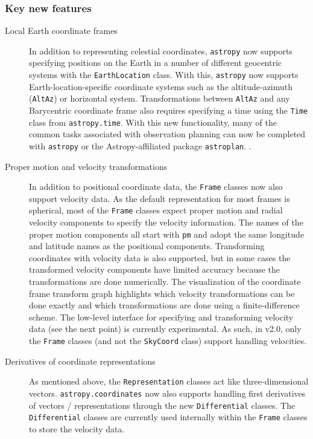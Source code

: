 \documentclass[modern]{aastex61}
\newcommand{\package}[1]{\texttt{#1}\xspace}
\newcommand{\astropy}{Astropy\xspace}
\newcommand{\astropypkg}{\package{astropy}\xspace}
\newcommand{\inlinecomment}[2]{\todo[inline]{#1: #2}\xspace}
\begin{document}
\subsubsection{Key new features}

\begin{description}
    \item[Local Earth coordinate frames] In addition to representing celestial
    coordinates, \astropypkg now supports specifying positions on the Earth in
    a number of different geocentric systems with the \texttt{EarthLocation}
    class.
    With this, \astropypkg now supports Earth-location-specific coordinate
    systems such as the altitude-azimuth (\texttt{AltAz}) or horizontal system.
    Transformations between \texttt{AltAz} and any Barycentric coordinate frame
    also requires specifying a time using the \texttt{Time} class from
    \texttt{astropy.time}.
    With this new functionality, many of the common tasks associated with
    observation planning can now be completed with \astropypkg or the
    \astropy-affiliated package \package{astroplan}. \inlinecomment{APW}{TODO: cite zenodo entry for astroplan?}.

    \item[Proper motion and velocity transformations]
    In addition to positional coordinate data, the \texttt{Frame} classes now
    also support velocity data.
    As the default representation for most frames is spherical, most of the
    \texttt{Frame} classes expect proper motion and radial velocity components
    to specify the velocity information.
    The names of the proper motion components all start with \texttt{pm} and
    adopt the same longitude and latitude names as the positional components.
    Transforming coordinates with velocity data is also supported, but in some
    cases the transformed velocity components have limited accuracy because the
    transformations are done numerically.
    The visualization of the coordinate frame transform graph highlights which
    velocity transformations can be done exactly and which transformations are
    done using a finite-difference scheme.
    The low-level interface for specifying and transforming velocity data (see
    the next point) is currently experimental.
    As such, in v2.0, only the \texttt{Frame} classes (and not the
    \texttt{SkyCoord} class) support handling velocities.

    \item[Derivatives of coordinate representations]
    As mentioned above, the \texttt{Representation} classes act like
    three-dimensional vectors.
    \texttt{astropy.coordinates} now also supports handling first derivatives of
    vectors / representations through the new \texttt{Differential} classes.
    The \texttt{Differential} classes are currently used internally within the
    \texttt{Frame} classes to store the velocity data.


\end{description}
\end{document}
